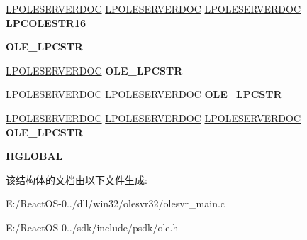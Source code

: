 \begin{DoxyCompactItemize}
\item 
\mbox{\label{struct___o_l_e_s_e_r_v_e_r_v_t_b_l_a73936006685ae612215ce3f0dadc9edd}} 
\hyperlink{struct___o_l_e_s_e_r_v_e_r_d_o_c}{L\+P\+O\+L\+E\+S\+E\+R\+V\+E\+R\+D\+OC} \hyperlink{struct___o_l_e_s_e_r_v_e_r_d_o_c}{L\+P\+O\+L\+E\+S\+E\+R\+V\+E\+R\+D\+OC} \hyperlink{struct___o_l_e_s_e_r_v_e_r_d_o_c}{L\+P\+O\+L\+E\+S\+E\+R\+V\+E\+R\+D\+OC} {\bfseries L\+P\+C\+O\+L\+E\+S\+T\+R16}
\item 
\mbox{\label{struct___o_l_e_s_e_r_v_e_r_v_t_b_l_aa2c453b420f5d52cad325b002b6aff5e}} 
{\bfseries O\+L\+E\+\_\+\+L\+P\+C\+S\+TR}
\item 
\mbox{\label{struct___o_l_e_s_e_r_v_e_r_v_t_b_l_ad7264e2542263c68381dd89e890b873d}} 
\hyperlink{struct___o_l_e_s_e_r_v_e_r_d_o_c}{L\+P\+O\+L\+E\+S\+E\+R\+V\+E\+R\+D\+OC} {\bfseries O\+L\+E\+\_\+\+L\+P\+C\+S\+TR}
\item 
\mbox{\label{struct___o_l_e_s_e_r_v_e_r_v_t_b_l_a1925d0299eea6773f097618396deb1d4}} 
\hyperlink{struct___o_l_e_s_e_r_v_e_r_d_o_c}{L\+P\+O\+L\+E\+S\+E\+R\+V\+E\+R\+D\+OC} \hyperlink{struct___o_l_e_s_e_r_v_e_r_d_o_c}{L\+P\+O\+L\+E\+S\+E\+R\+V\+E\+R\+D\+OC} {\bfseries O\+L\+E\+\_\+\+L\+P\+C\+S\+TR}
\item 
\mbox{\label{struct___o_l_e_s_e_r_v_e_r_v_t_b_l_aa2c453b420f5d52cad325b002b6aff5e}} 
\hyperlink{struct___o_l_e_s_e_r_v_e_r_d_o_c}{L\+P\+O\+L\+E\+S\+E\+R\+V\+E\+R\+D\+OC} \hyperlink{struct___o_l_e_s_e_r_v_e_r_d_o_c}{L\+P\+O\+L\+E\+S\+E\+R\+V\+E\+R\+D\+OC} \hyperlink{struct___o_l_e_s_e_r_v_e_r_d_o_c}{L\+P\+O\+L\+E\+S\+E\+R\+V\+E\+R\+D\+OC} {\bfseries O\+L\+E\+\_\+\+L\+P\+C\+S\+TR}
\item 
\mbox{\label{struct___o_l_e_s_e_r_v_e_r_v_t_b_l_a7dc2552301a6039de2e7d7c10dc26b05}} 
{\bfseries H\+G\+L\+O\+B\+AL}
\end{DoxyCompactItemize}


该结构体的文档由以下文件生成\+:\begin{DoxyCompactItemize}
\item 
E\+:/\+React\+O\+S-\/0../dll/win32/olesvr32/olesvr\+\_\+main.\+c\item 
E\+:/\+React\+O\+S-\/0../sdk/include/psdk/ole.\+h\end{DoxyCompactItemize}

